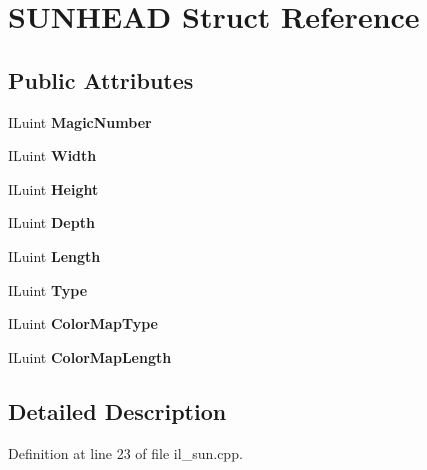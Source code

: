 \hypertarget{structSUNHEAD}{}\section{S\+U\+N\+H\+E\+AD Struct Reference}
\label{structSUNHEAD}
\subsection*{Public Attributes}
\begin{DoxyCompactItemize}
\item 
\mbox{\label{structSUNHEAD_af278a378207367412d88e9ca3f9450ba}} 
I\+Luint {\bfseries Magic\+Number}
\item 
\mbox{\label{structSUNHEAD_a2750b68d7c59855925e92a84379f8b57}} 
I\+Luint {\bfseries Width}
\item 
\mbox{\label{structSUNHEAD_a980175b9beab622b891aebd21b75c74e}} 
I\+Luint {\bfseries Height}
\item 
\mbox{\label{structSUNHEAD_ad0acf3c91e7caf172580cd756c3c9a7d}} 
I\+Luint {\bfseries Depth}
\item 
\mbox{\label{structSUNHEAD_a502f0b21ce0779738da3edcc010dbd82}} 
I\+Luint {\bfseries Length}
\item 
\mbox{\label{structSUNHEAD_a47416f821dd37691e535ead3ee527626}} 
I\+Luint {\bfseries Type}
\item 
\mbox{\label{structSUNHEAD_a12b59b9c5eb1e88e34561b9b92166c4c}} 
I\+Luint {\bfseries Color\+Map\+Type}
\item 
\mbox{\label{structSUNHEAD_a8853eb5dc6f80653211b0f13a5816a0d}} 
I\+Luint {\bfseries Color\+Map\+Length}
\end{DoxyCompactItemize}


\subsection{Detailed Description}


Definition at line 23 of file il\+\_\+sun.\+cpp.



